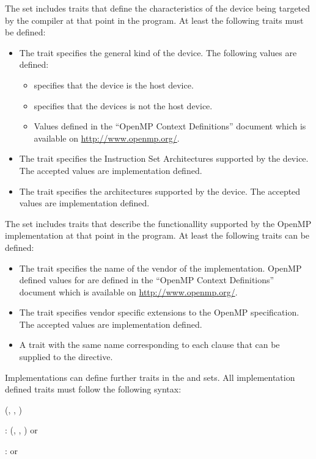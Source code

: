 The  set includes traits that define the characteristics of the device being targeted by the compiler at that point in the program. At least the following traits must be defined:
\begin{itemize}
 \item The  trait specifies the general kind of the device. The following  values are defined:
 \begin{itemize}
  \item {} specifies that the device is the host device.
  \item {} specifies that the devices is not the host device. 
  \item Values defined in the ``OpenMP Context Definitions'' document which is available on \url{http://www.openmp.org/}. 
 \end{itemize}
 \item The  trait specifies the Instruction Set Architectures supported by the device. The accepted  values are implementation defined.
 \item The  trait specifies the architectures supported by the device. The accepted  values are implementation defined.
\end{itemize}

The  set includes traits that describe the functionallity supported by the OpenMP implementation at that point in the program. At least the following traits can be defined:
\begin{itemize}
 \item The  trait specifies the name of the vendor of the implementation. OpenMP defined values for  are defined in the ``OpenMP Context Definitions'' document which is available on \url{http://www.openmp.org/}. 
 \item The  trait specifies vendor specific extensions to the OpenMP specification. The accepted  values are implementation defined.
 \item A trait with the same name corresponding to each clause that can be supplied to the  directive.
\end{itemize}

Implementations can define further traits in the  and  sets. All implementation defined traits must follow the following syntax:
\begin{ompSyntax}
\plc{identifier[}(\plc{context-element[}, \plc{context-element[}, \plc{...]]})\plc{]}

:
  \plc{identifier[}(\plc{context-element[}, \plc{context-element[}, \plc{...]]})\plc{]}
  or

:
  or
\end{ompSyntax}

